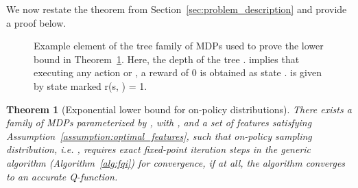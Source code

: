 \documentclass[jmlr]{article}
\newtheorem{theorem}{Theorem}[section]
\begin{document}
We now restate the theorem from Section~\ref{sec:problem_description} and provide a proof below. 
\begin{figure}
    \centering
    \caption{\footnotesize{Example element of the tree family of MDPs used to prove the lower bound in Theorem~\ref{thm:app_exp_lower_bound}. Here, the depth of the tree .  implies that executing any action  or , a reward of 0 is obtained as state .  is given by state marked r(s, ) = 1.}}
    \label{fig:tree_fig}
\end{figure}

\begin{theorem}[Exponential lower bound for on-policy distributions]
\label{thm:app_exp_lower_bound}
There exists a family of MDPs parameterized by , with ,   and a set of features satisfying Assumption~\ref{assumption:optimal_features}, such that on-policy sampling distribution, i.e. , requires  \textit{exact} fixed-point iteration steps in the generic algorithm (Algorithm~\ref{alg:fqi}) for convergence, if at all, the algorithm converges to an accurate Q-function. 
\end{theorem}
\end{document}
